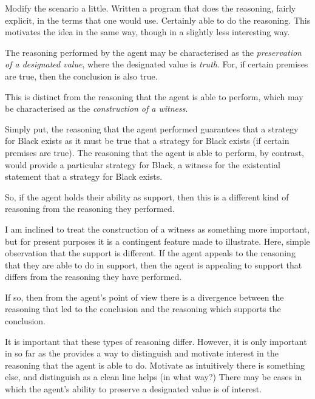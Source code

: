 \documentclass[10pt]{article}
\begin{document}
\begin{note}
  Modify the scenario a little.
  Written a program that does the reasoning, fairly explicit, in the terms that one would use.
  Certainly able to do the reasoning.
  This motivates the idea in the same way, though in a slightly less interesting way.
\end{note}


\begin{note}

  The reasoning performed by the agent may be characterised as the \emph{preservation of a designated value}, where the designated value is \emph{truth}.
  For, if certain premises are true, then the conclusion is also true.

  This is distinct from the reasoning that the agent is able to perform, which may be characterised as the \emph{construction of a witness}.

  Simply put, the reasoning that the agent performed guarantees that a strategy for Black exists as it must be true that a strategy for Black exists (if certain premises are true).
  The reasoning that the agent is able to perform, by contrast, would provide a particular strategy for Black, a witness for the existential statement that a strategy for Black exists.

  So, if the agent holds their ability as support, then this is a different kind of reasoning from the reasoning they performed.

  I am inclined to treat the construction of a witness as something more important, but for present purposes it is a contingent feature made to illustrate.
  Here, simple observation that the support is different.
  If the agent appeals to the reasoning that they are able to do in support, then the agent is appealing to support that differs from the reasoning they have performed.

  If so, then from the agent's point of view there is a divergence between the reasoning that led to the conclusion and the reasoning which supports the conclusion.

  {
    \color{red}
    It is important that these types of reasoning differ.
    However, it is only important in so far as the provides a way to distinguish and motivate interest in the reasoning that the agent is able to do.
    Motivate as intuitively there is something else, and distinguish as a clean line helps (in what way?)
    There may be cases in which the agent's ability to preserve a designated value is of interest.
  }


\end{note}
\end{document}
